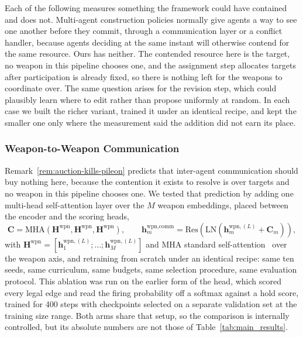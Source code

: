 Each of the following measures something the framework could have contained
and does not. Multi-agent construction policies normally give agents a way to
see one another before they commit, through a communication layer or a
conflict handler, because agents deciding at the same instant will otherwise
contend for the same resource. Ours has neither. The contended resource here
is the target, no weapon in this pipeline chooses one, and the assignment step
allocates targets after participation is already fixed, so there is nothing
left for the weapons to coordinate over. The same question arises for the
revision step, which could plausibly learn where to edit rather than propose
uniformly at random. In each case we built the richer variant, trained it
under an identical recipe, and kept the smaller one only where the measurement
said the addition did not earn its place.


\subsubsection{Weapon-to-Weapon Communication}
\label{sec:comm-ablation}

Remark~\ref{rem:auction-kills-pileon} predicts that inter-agent communication
should buy nothing here, because the contention it exists to resolve is over
targets and no weapon in this pipeline chooses one. We tested that prediction
by adding one multi-head self-attention layer over the $M$ weapon embeddings,
placed between the encoder and the scoring heads,
\begin{equation}
\label{eq:comm-attn}
\bm{C} = \text{MHA}\!\left(\bm{H}^{\text{wpn}}, \bm{H}^{\text{wpn}}, \bm{H}^{\text{wpn}}\right), \qquad
\bm{h}_m^{\text{wpn,comm}} = \text{Res}\!\left(\text{LN}\!\left(\bm{h}_m^{\text{wpn},(L)} + \bm{C}_m\right)\right),
\end{equation}
with $\bm{H}^{\text{wpn}} = [\bm{h}_1^{\text{wpn},(L)}; \ldots; \bm{h}_M^{\text{wpn},(L)}]$
and $\text{MHA}$ standard self-attention~\cite{vaswani2017attention} over the
weapon axis, and retraining from scratch under an identical recipe: same ten
seeds, same curriculum, same budgets, same selection procedure, same
evaluation protocol. This ablation was run on the earlier form of the head,
which scored every legal edge and read the firing probability off a softmax
against a hold score, trained for 400 steps with checkpoints selected on a
separate validation set at the training size range. Both arms share that
setup, so the comparison is internally controlled, but its absolute numbers
are not those of Table~\ref{tab:main_results}.


